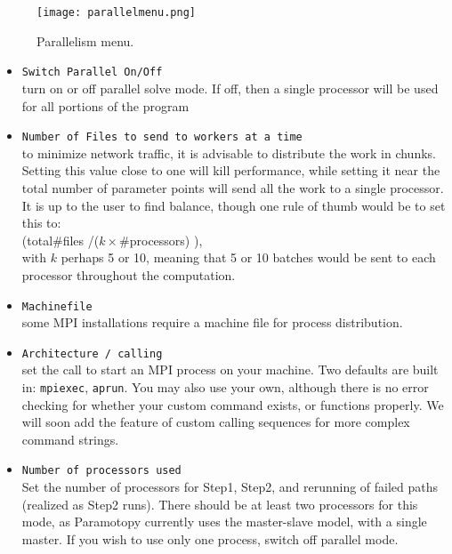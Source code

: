 \begin{figure}[h]
\begin{center}
\texttt{[image: parallelmenu.png]}
\caption[Parallelism Menu]{Parallelism menu.}
\label{screen:parallelmenu}
\end{center}
\end{figure}

\begin{itemize}
	\item \texttt{Switch Parallel On/Off}  \\turn on or off parallel solve mode.  If off, then a single processor will be used for all portions of the program
	
	\item \texttt{Number of Files to send to workers at a time}\\ to minimize network traffic, it is advisable to distribute the work in chunks.  Setting this value close to one will kill performance, while setting it near the total number of parameter points will send all the work to a single processor.  It is up to the user to find balance, though one rule of thumb would be to set this to:   \\ \hspace{2in} (total\#files /($k \times $\#processors) ), \\with $k$ perhaps 5 or 10, meaning that 5 or 10 batches would be sent to each processor throughout the computation.
	
	\item \texttt{Machinefile} \\ some MPI installations require a machine file for process distribution.
	
	\item \texttt{Architecture / calling} \\ set the call to start an MPI process on your machine.  Two defaults are built in: \texttt{mpiexec}, \texttt{aprun}.  You may also use your own, although there is no error checking for whether your custom command exists, or functions properly.  We will soon add the feature of custom calling sequences for more complex command strings.
	
	\item \texttt{Number of processors used} \\ Set the number of processors for Step1, Step2, and rerunning of failed paths (realized as Step2 runs).  There should be at least two processors for this mode, as Paramotopy currently uses the master-slave model, with a single master.  If you wish to use only one process, switch off parallel mode.
	


\end{itemize}


